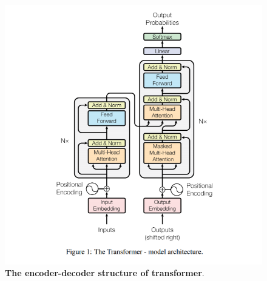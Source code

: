 \documentclass[11pt]{article}
\begin{document}
\begin{figure}
\begin{minipage}[t]{1\linewidth}
  \centering
  \centerline{\includegraphics[scale = 0.4]{transformer.png}}
\end{minipage}
\caption{\footnotesize{\textbf{The encoder-decoder structure of transformer}.}}
\label{fig: transformer_block}
\end{figure}
\end{document}

